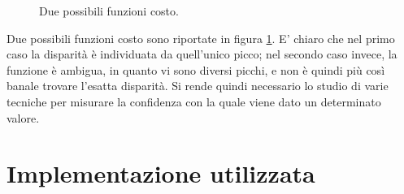 \documentclass[12pt]{report}
\begin{document}
			
		\begin{figure}[<h>]
			\centering
			 \quad
			\caption{Due possibili funzioni costo.}
			\label{fig:costi}
		\end{figure}	
		
		\noindent Due possibili funzioni costo sono riportate in figura \ref{fig:costi}. E' chiaro che nel primo caso la disparità  è individuata da quell'unico picco; nel secondo caso invece, la funzione è ambigua, in quanto vi sono diversi picchi, e non è quindi più così banale trovare l'esatta disparità. Si rende quindi necessario lo studio di varie tecniche per misurare la confidenza con la quale viene dato un determinato valore.
		
		
		\section{Implementazione utilizzata}
		\label{sec:implementazione}
		
\end{document}
